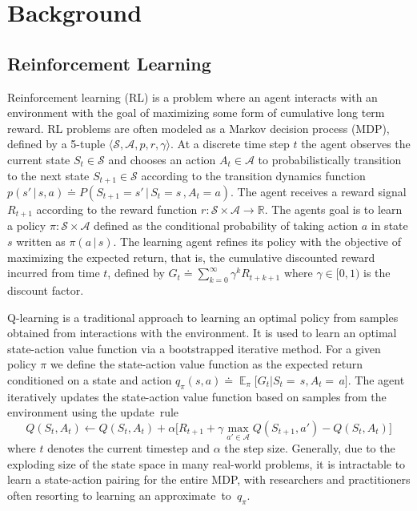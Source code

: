\documentclass{article}
\begin{document}
\section{Background}
\subsection{Reinforcement Learning}
Reinforcement learning (RL) is a problem where an agent interacts with an environment with the goal of maximizing some form of cumulative long term reward. 
RL problems are often modeled as a Markov decision process (MDP), defined by a 5-tuple $\langle \mathscr{S}, \mathscr{A}, p, r, \gamma \rangle$. At a discrete time step $t$ the agent observes the current state $S_t \in \mathscr{S}$ and chooses an action $A_t \in \mathscr{A}$ to probabilistically transition to the next state $S_{t+1} \in \mathscr{S}$ according to the transition dynamics function $p(s' \,|\, s, a ) \doteq P(S_{t+1} = s' \,|\, S_t = s\,, A_t = a) $. The agent receives a reward signal $R_{t+1}$ according to the reward function $r : \mathscr{S} \times \mathscr{A} \to \mathbb{R}$. The agents goal is to learn a policy $\pi : \mathscr{S} \times \mathscr{A}$ defined as the conditional probability of taking action $a$ in state $s$ written as $\pi(a\,|\,s)$. The learning agent refines its policy with the objective of maximizing the expected return, that is, the cumulative discounted reward incurred from time $t$, defined by $G_t \doteq \sum_{k=0}^\infty \gamma^k R_{t+k+1}$ where $\gamma \in [0, 1)$ is the discount factor.

Q-learning \citep{Watkins92} is a traditional approach to learning an optimal policy from samples obtained from interactions with the environment. It is used to learn an optimal state-action value function via a bootstrapped iterative method.
For a given policy $\pi$ we define the state-action value function as the expected return conditioned on a state and action ${q_{\pi}(s, a) \doteq \mathop{\mathbb{E}}_{\pi} \big[ G_t | S_t = \, s ,  A_t = \, a \big]}$. The agent iteratively updates the state-action value function based on samples from the environment using the update~rule
$$
Q(S_t, A_t) \gets Q(S_t, A_t) + \alpha \big[ R_{t+1} + \gamma \max_{a' \in \mathcal{A}}{Q(S_{t+1}, a')} - Q(S_t, A_t) \big]
$$
where $t$ denotes the current timestep and $\alpha$ the step size.
Generally, due to the exploding size of the state space in many real-world problems, it is intractable to learn a state-action pairing for the entire MDP, with researchers and practitioners often resorting to learning an approximate~to~$q_{\pi}$.
\end{document}
